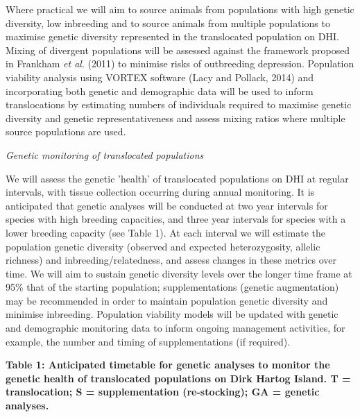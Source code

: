\documentclass[version=last,
    paper=a4,                               %
    10pt,                                   %
    dvipsnames,
    oneside,                              %
    headings=openany,                       %
    open=any,
    BCOR=7mm,                               %
    DIV=15,     %
]{scrbook}
\begin{document}
Where practical we will aim to source animals from populations with high
genetic diversity, low inbreeding and to source animals from multiple
populations to maximise genetic diversity represented in the
translocated population on DHI. Mixing of divergent populations will be
assessed against the framework proposed in Frankham \emph{et al}. (2011)
to minimise risks of outbreeding depression. Population viability
analysis using VORTEX software (Lacy and Pollack, 2014) and
incorporating both genetic and demographic data will be used to inform
translocations by estimating numbers of individuals required to maximise
genetic diversity and genetic representativeness and assess mixing
ratios where multiple source populations are used.

\emph{Genetic monitoring of translocated populations}

We will assess the genetic 'health' of translocated populations on DHI
at regular intervals, with tissue collection occurring during annual
monitoring. It is anticipated that genetic analyses will be conducted at
two year intervals for species with high breeding capacities, and three
year intervals for species with a lower breeding capacity (see Table 1).
At each interval we will estimate the population genetic diversity
(observed and expected heterozygosity, allelic richness) and
inbreeding/relatedness, and assess changes in these metrics over time.
We will aim to sustain genetic diversity levels over the longer time
frame at 95\% that of the starting population; supplementations (genetic
augmentation) may be recommended in order to maintain population genetic
diversity and minimise inbreeding. Population viability models will be
updated with genetic and demographic monitoring data to inform ongoing
management activities, for example, the number and timing of
supplementations (if required).

\textbf{Table 1: Anticipated timetable for genetic analyses to monitor
the genetic health of translocated populations on Dirk Hartog Island. T
= translocation; S = supplementation (re-stocking); GA = genetic
analyses.}
\end{document}
